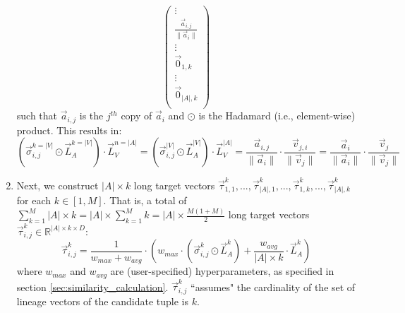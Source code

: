 \begin{enumerate}
\begin{equation*}
\begin{pmatrix}
                   \vdots\\
                   \frac{\vec{a}_{i, j}}{\lVert \vec{a}_i \rVert}\\ 
                   \vdots\\
                   \vec{0}_{1, k}\\ 
                   \vdots\\ 
                   \vec{0}_{|A|, k}\\ 
                   \end{pmatrix}
    \end{equation*}
    such that $\vec{a}_{i, j}$ is the $j^{th}$ copy of $\vec{a}_i$ and $\odot$ is the Hadamard (i.e., element-wise) product.
    This results in:
    \begin{equation*}
        (\vec{\sigma}_{i, j}^{k=|V|} \odot \vec{L}_{A}^{k=|V|}) \cdot \vec{L}_V^{n=|A|} =
        (\vec{\sigma}_{i, j}^{|V|} \odot \vec{L}_{A}^{|V|}) \cdot \vec{L}_V^{|A|} = \frac{\vec{a}_{i, j}}{\lVert \vec{a}_i \rVert} \cdot \frac{\vec{v}_{j, i}}{\lVert \vec{v}_j \rVert} = \frac{\vec{a}_{i}}{\lVert \vec{a}_i \rVert} \cdot \frac{\vec{v}_{j}}{\lVert \vec{v}_j \rVert}
    \end{equation*}
    
    \item Next, we construct $|A| \times k$ long target vectors $\vec{\tau}_{1, 1}^k, ..., \vec{\tau}_{|A|, 1}^k, ..., \vec{\tau}_{1, k}^k, ..., \vec{\tau}_{|A|, k}^k$ for each $k \in [1, M]$. That is, a total of $\sum_{k=1}^M |A| \times k = |A| \times \sum_{k=1}^M k = |A| \times \frac{M(1 + M)}{2}$ long target vectors $\vec{\tau}_{i, j}^k \in \mathbb{R}^{|A| \times k \times D}$:
    \begin{equation*}
        \vec{\tau}_{i, j}^k =
        \frac{1}{w_{max} + w_{avg}} \cdot \left (
        w_{max} \cdot (\vec{\sigma}_{i, j}^k \odot \vec{L}_{A}^k) 
        + \frac{w_{avg}}{|A| \times k} \cdot \vec{L}_{A}^k
        \right )
    \end{equation*}
    where $w_{max}$ and $w_{avg}$ are (user-specified) hyperparameters, as specified in section \ref{sec:similarity_calculation}. 
    $\vec{\tau}_{i, j}^k$ ``assumes" the cardinality of the set of lineage vectors of the candidate tuple is $k$.
    

\end{enumerate}
